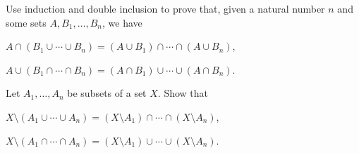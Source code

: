 \begin{exercises}
\item Use induction and double inclusion to prove that, given a natural number $n$ and some sets $A, B_1,\ldots,B_n$, we have
\begin{lettered}
\item $A \cap (B_1 \cup \cdots \cup B_n) = (A\cup B_1) \cap \cdots \cap (A \cup B_n)$,
\item $A \cup (B_1 \cap \cdots \cap B_n) = (A\cap B_1) \cup \cdots \cup (A \cap B_n)$.
\end{lettered}
Let $A_1,\ldots,A_n$ be subsets of a set $X$. Show that
\begin{lettered}[resume]
\item $X \setminus (A_1 \cup \cdots \cup A_n) = (X \setminus A_1) \cap \cdots \cap (X \setminus A_n)$,
\item $X \setminus (A_1 \cap \cdots \cap A_n) = (X \setminus A_1) \cup \cdots \cup (X \setminus A_n)$.
\end{lettered}
\end{exercises}

